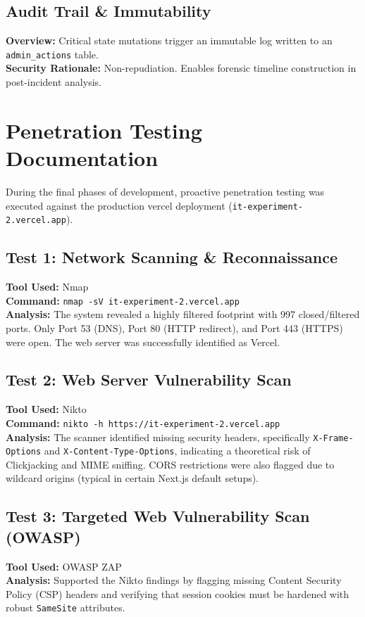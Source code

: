 \documentclass[12pt,a4paper]{report}
\begin{document}
\section{Audit Trail \& Immutability}
\textbf{Overview:} Critical state mutations trigger an immutable log written to an \texttt{admin\_actions} table. \\
\textbf{Security Rationale:} Non-repudiation. Enables forensic timeline construction in post-incident analysis.

\chapter{Penetration Testing Documentation}
During the final phases of development, proactive penetration testing was executed against the production vercel deployment (\texttt{it-experiment-2.vercel.app}).

\section{Test 1: Network Scanning \& Reconnaissance}
\textbf{Tool Used:} Nmap \\
\textbf{Command:} \texttt{nmap -sV it-experiment-2.vercel.app} \\
\textbf{Analysis:} The system revealed a highly filtered footprint with 997 closed/filtered ports. Only Port 53 (DNS), Port 80 (HTTP redirect), and Port 443 (HTTPS) were open. The web server was successfully identified as Vercel.

\section{Test 2: Web Server Vulnerability Scan}
\textbf{Tool Used:} Nikto \\
\textbf{Command:} \texttt{nikto -h https://it-experiment-2.vercel.app} \\
\textbf{Analysis:} The scanner identified missing security headers, specifically \texttt{X-Frame-Options} and \texttt{X-Content-Type-Options}, indicating a theoretical risk of Clickjacking and MIME sniffing. CORS restrictions were also flagged due to wildcard origins (typical in certain Next.js default setups).

\section{Test 3: Targeted Web Vulnerability Scan (OWASP)}
\textbf{Tool Used:} OWASP ZAP \\
\textbf{Analysis:} Supported the Nikto findings by flagging missing Content Security Policy (CSP) headers and verifying that session cookies must be hardened with robust \texttt{SameSite} attributes.
\end{document}
